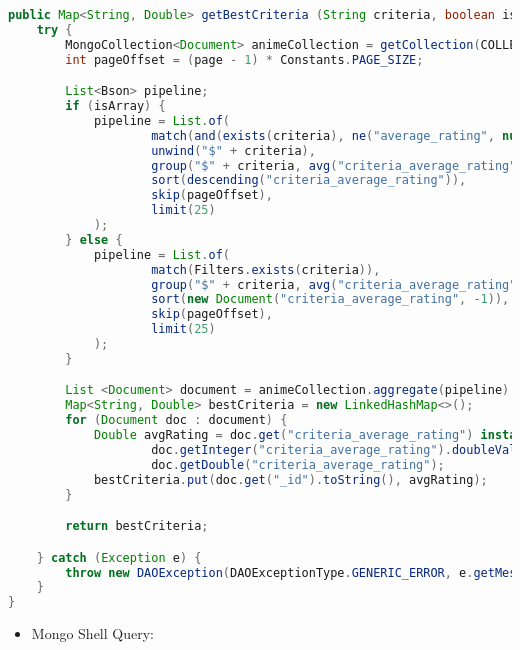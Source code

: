 \begin{mdframed}[style=customstyle]
\begin{lstlisting}[language=java]
public Map<String, Double> getBestCriteria (String criteria, boolean isArray, int page) throws DAOException {
    try {
        MongoCollection<Document> animeCollection = getCollection(COLLECTION_NAME);
        int pageOffset = (page - 1) * Constants.PAGE_SIZE;

        List<Bson> pipeline;
        if (isArray) {
            pipeline = List.of(
                    match(and(exists(criteria), ne("average_rating", null))),
                    unwind("$" + criteria),
                    group("$" + criteria, avg("criteria_average_rating", "$average_rating")),
                    sort(descending("criteria_average_rating")),
                    skip(pageOffset),
                    limit(25)
            );
        } else {
            pipeline = List.of(
                    match(Filters.exists(criteria)),
                    group("$" + criteria, avg("criteria_average_rating", "$average_rating")),
                    sort(new Document("criteria_average_rating", -1)),
                    skip(pageOffset),
                    limit(25)
            );
        }

        List <Document> document = animeCollection.aggregate(pipeline).into(new ArrayList<>());
        Map<String, Double> bestCriteria = new LinkedHashMap<>();
        for (Document doc : document) {
            Double avgRating = doc.get("criteria_average_rating") instanceof Integer?
                    doc.getInteger("criteria_average_rating").doubleValue() :
                    doc.getDouble("criteria_average_rating");
            bestCriteria.put(doc.get("_id").toString(), avgRating);
        }

        return bestCriteria;

    } catch (Exception e) {
        throw new DAOException(DAOExceptionType.GENERIC_ERROR, e.getMessage());
    }
}\end{lstlisting}
\end{mdframed}

\begin{itemize}
    \item Mongo Shell Query:
\end{itemize}

